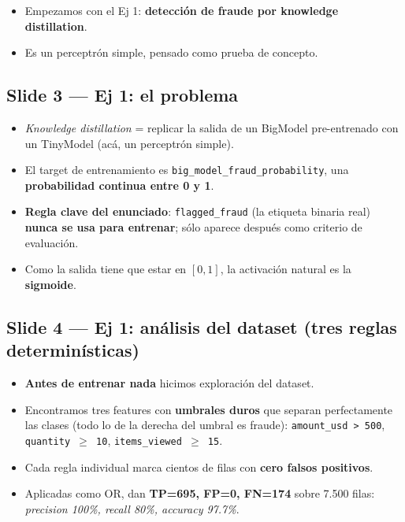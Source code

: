 \documentclass[11pt,a4paper]{article}
\begin{document}
\begin{decir}
\begin{itemize}[leftmargin=*,topsep=0pt]
  \item Empezamos con el Ej 1: \textbf{detección de fraude por knowledge distillation}.
  \item Es un perceptrón simple, pensado como prueba de concepto.
\end{itemize}
\end{decir}

\subsection{Slide 3 — Ej 1: el problema}

\begin{decir}
\begin{itemize}[leftmargin=*,topsep=0pt]
  \item \emph{Knowledge distillation} = replicar la salida de un BigModel pre-entrenado
        con un TinyModel (acá, un perceptrón simple).
  \item El target de entrenamiento es \texttt{big\_model\_fraud\_probability}, una
        \textbf{probabilidad continua entre 0 y 1}.
  \item \textbf{Regla clave del enunciado}: \texttt{flagged\_fraud} (la etiqueta binaria
        real) \textbf{nunca se usa para entrenar}; sólo aparece después como criterio
        de evaluación.
  \item Como la salida tiene que estar en $[0,1]$, la activación natural es la
        \textbf{sigmoide}.
\end{itemize}
\end{decir}

\subsection{Slide 4 — Ej 1: análisis del dataset (tres reglas determinísticas)}

\begin{decir}
\begin{itemize}[leftmargin=*,topsep=0pt]
  \item \textbf{Antes de entrenar nada} hicimos exploración del dataset.
  \item Encontramos tres features con \textbf{umbrales duros} que separan
        perfectamente las clases (todo lo de la derecha del umbral es fraude):
        \texttt{amount\_usd > 500}, \texttt{quantity $\geq$ 10}, \texttt{items\_viewed $\geq$ 15}.
  \item Cada regla individual marca cientos de filas con \textbf{cero falsos positivos}.
  \item Aplicadas como OR, dan \textbf{TP=695, FP=0, FN=174} sobre 7.500 filas:
        \emph{precision 100\%, recall 80\%, accuracy 97.7\%}.
\end{itemize}
\end{decir}
\end{document}
